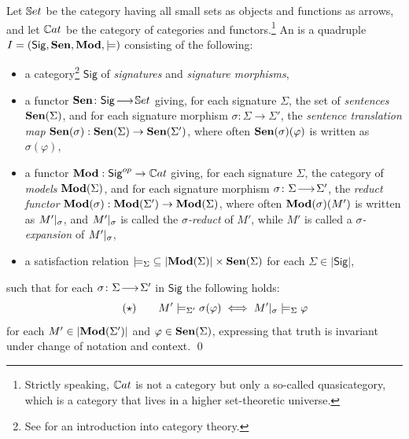 \documentclass[10pt, a4paper]{isov2}
\newcommand{\Sig}{\mathsf{Sig}}
\begin{document}
\begin{definition}\label{def:inst}  Let $\mathbb{S}et$ be the
category having all small \textsc{}sets as objects and functions as
arrows, and let $\mathbb{C}at$ be the category
of categories and functors.\footnote {Strictly speaking, $\mathbb{C}at$ is not a
category but only a so-called quasicategory, which is a category that
lives in a higher set-theoretic universe.}
An
 \cite{GoguenBurstall92} is a quadruple $I=(\Sig,\sen,\IMod,{\models})$
consisting of the following:
%
\begin{itemize}
\item a category\footnote{See \cite{AHS}\cite{MacLane} for an introduction into category theory.} $\Sig$ of \emph{signatures} and \emph{signature morphisms},
\item a functor $\sen\map{\Sig}{\Set}$  giving, for each signature $\Sigma$, the set of
\emph{sentences} $\mathbf {Sen}(\Sigma)$, and for each signature morphism
$\sigma:{\Sigma}\to{\Sigma'}$, the \emph{sentence translation map}
$\mathbf {Sen}(\sigma):{\mathbf {Sen}(\Sigma)}\to{\mathbf {Sen}(\Sigma')}$, where often
$\mathbf {Sen}(\sigma)(\varphi)$ is written as $\sigma(\varphi)$, \item a
functor $\IMod:{\Sig^{op}}\to{\Cat}$ giving, for each signature
$\Sigma$, the category of \emph{models} $\mathbf{Mod}(\Sigma)$, and for each
signature morphism $\sigma\colon\Sigma\!\longrightarrow\!\Sigma'$, the \emph{reduct
functor\/} $\mathbf{Mod}(\sigma):{\mathbf{Mod}(\Sigma')}\to {\mathbf{Mod}(\Sigma)}$, where
often $\mathbf{Mod}(\sigma)(M')$ is written as $M'|_{\sigma}$, and
$M'|_{\sigma}$ is called the \emph{$\sigma$-reduct} of $M'$,
while $M'$ is called a \emph{$\sigma$-expansion} of
$M'|_{\sigma}$,
\item a satisfaction relation
${\models_{\Sigma}}\subseteq|{\mathbf{Mod}(\Sigma)|\times\mathbf {Sen}(\Sigma)}$ for
each $\Sigma\in |\Sig|$,
\end{itemize}
%
such that for each $\sigma\colon\Sigma\!\longrightarrow\!\Sigma'$ in $\Sig$ the following  holds:
%
\begin{equation}
\tag{$\star$} \qquad M'\models_{\Sigma'}\sigma(\varphi) \iff
M'|_{\sigma} \models_{\Sigma} \varphi
\end{equation}
%
for each $M'\in |\mathbf{Mod}(\Sigma')|$ and $\varphi\in \mathbf {Sen}(\Sigma)$,
expressing that truth is invariant under change of notation and
context.  \qed
\end{definition}
\end{document}

